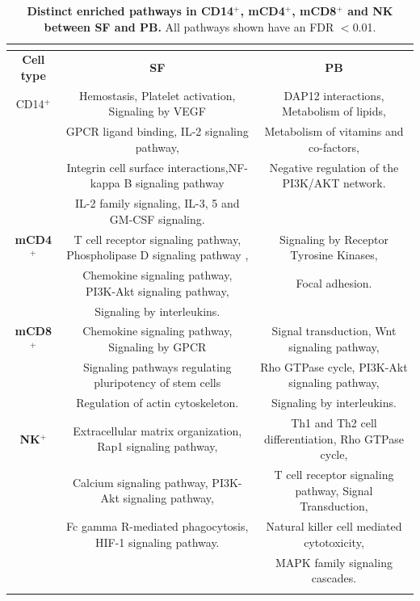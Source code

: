 \begin{landscape}
\begin{center}
\begin{longtable}[ht]{c c c }
\caption[Distinct enriched pathways in CD14$^+$, mCD4$^+$, mCD8$^+$ and NK between SF and PB]{\textbf{Distinct enriched pathways in CD14$^+$, mCD4$^+$, mCD8$^+$ and NK between SF and PB.} All pathways shown have an FDR $<$0.01.}
\\
\label{table:PSA_ATAC_pathway_analysis_all_DOC} \\
\toprule
\textbf{Cell type} & \textbf{SF} & \textbf{PB} \\						
\midrule
\midrule
CD14$^+$ & Hemostasis, Platelet activation, Signaling by VEGF & DAP12 interactions, Metabolism of lipids, \\ 
         & GPCR ligand binding, IL-2 signaling pathway, & Metabolism of vitamins and co-factors, \\ 
         & Integrin cell surface interactions,NF-kappa B signaling pathway & Negative regulation of the PI3K/AKT network. \\ 
         & IL-2 family signaling, IL-3, 5 and GM-CSF signaling. & \\ 
\midrule
\textbf{mCD4$^+$} & T cell receptor signaling pathway, Phospholipase D signaling pathway ,& Signaling by Receptor Tyrosine Kinases,\\ 
									& Chemokine signaling pathway, PI3K-Akt signaling pathway, & Focal adhesion.\\ 
									& Signaling by interleukins. & \\
\midrule
\textbf{mCD8$^+$} & Chemokine signaling pathway, Signaling by GPCR  & Signal transduction, Wnt signaling pathway,\\ 
									& Signaling pathways regulating pluripotency of stem cells & Rho GTPase cycle, PI3K-Akt signaling pathway, \\ 
									& Regulation of actin cytoskeleton. & Signaling by interleukins. \\ 
\midrule
\textbf{NK$^+$} & Extracellular matrix organization, Rap1 signaling pathway, & Th1 and Th2 cell differentiation, Rho GTPase cycle,\\ 		
								& Calcium signaling pathway, PI3K-Akt signaling pathway,     & T cell receptor signaling pathway, Signal Transduction,\\ 
								& Fc gamma R-mediated phagocytosis, HIF-1 signaling pathway. & Natural killer cell mediated cytotoxicity,  \\
								&                                                            & MAPK family signaling cascades.	\\ 								
\bottomrule
\medskip
\end{longtable}
\end{center}
\end{landscape}



